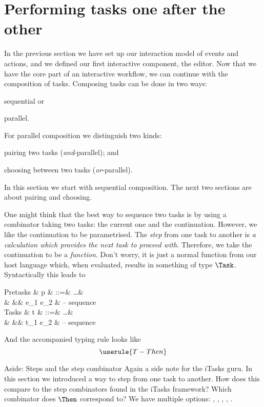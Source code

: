 
\section{Performing tasks one after the other}

In the previous section we have set up our interaction model of events and actions,
and we defined our first interactive component, the editor.
Now that we have the core part of an interactive workflow,
we can continue with the composition of tasks.
Composing tasks can be done in two ways:
\begin{enumerate*}
  \item sequential or
  \item parallel.
\end{enumerate*}
For parallel composition we distinguish two kinds:
\begin{enumerate*}[(a)]
  \item pairing two tasks (\emph{and}-parallel); and
  \item choosing between two tasks (\emph{or}-parallel).
\end{enumerate*}
In this section we start with sequential composition.
The next two sections are about pairing and choosing.

One might think that the best way to sequence two tasks is by using a combinator taking two tasks:
the current one and the continuation.
However, we like the continuation to be parametrised.
The \emph{step} from one task to another is \emph{a calculation which provides the next task to proceed with}.
Therefore, we take the continuation to be a \emph{function}.
Don't worry, it is just a normal function from our host language which,
when evaluated, results in something of type $\Task$.
Syntactically this leads to
\begin{grammar}
  Pretasks
    & p & ::=& \ldots        & \\
    &   &\mid& e_1 \Then e_2 & – sequence \\
  Tasks
    & t & ::=& \ldots        & \\
    &   &\mid& t_1 \Then e_2 & – sequence \\
\end{grammar}
And the accompanied typing rule looks like
\begin{equation*}
  \userule{T-Then}
\end{equation*}

\begin{margintext}{Aside: Steps and the step combinator}
Again a side note for the iTasks guru.
In this section we introduced a way to step from one task to another.
How does this compare to the step combinators found in the iTasks framework?
Which combinator does $\Then$ correspond to?
We have multiple options: \type{(>>*)}, \type{(>>=)}, \type{(>>-)}, \type{(>>\~)}, \type{(>>|)}.
\end{margintext}


